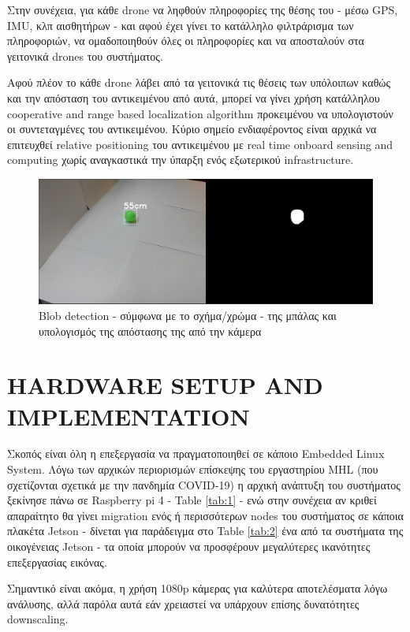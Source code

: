 Στην συνέχεια, για κάθε drone να ληφθούν πληροφορίες της θέσης του - μέσω GPS, IMU, κλπ αισθητήρων -
και αφού έχει γίνει το κατάλληλο φιλτράρισμα των πληροφοριών, να ομαδοποιηθούν όλες οι πληροφορίες και 
να αποσταλούν στα γειτονικά drones του συστήματος. 

Αφού πλέον το κάθε drone λάβει από τα γειτονικά τις 
θέσεις των υπόλοιπων καθώς και την απόσταση του αντικειμένου από αυτά, μπορεί να γίνει χρήση κατάλληλου
cooperative and range based localization algorithm προκειμένου να υπολογιστούν οι συντεταγμένες του αντικειμένου.
Κύριο σημείο ενδια\-φέ\-ρο\-ντος είναι αρχικά να επιτευχθεί relative positioning του α\-ντι\-κει\-μένου με real time 
onboard sensing and computing χωρίς αναγκαστικά την ύπαρξη ενός εξωτερικού infrastructure.

\begin{figure}[thpb]
  \centering
  \includegraphics[width=\linewidth]{Images/Thesis-Proposal-shape-color-detection.png}
  \caption{Blob detection - σύμφωνα με το σχήμα/χρώμα - της μπάλας και υπολογισμός της απόστασης της από την κάμερα}
  \label{fig:2}
\end{figure}

\section{HARDWARE SETUP AND IMPLEMENTATION}
Σκοπός είναι όλη η επεξεργασία να πραγματοποιηθεί σε κάποιο Embedded Linux System. 
Λόγω των αρχικών πε\-ριο\-ρι\-σμών επίσκεψης του εργαστηρίου MHL (που σχετίζονται σχετικά με την πανδημία COVID-19)
η αρχική ανάπτυξη του συστήματος ξεκίνησε πάνω σε Raspberry pi 4 - Table \ref{tab:1} - ενώ στην συνέχεια αν κριθεί απαραίτητο
θα γίνει migration ενός ή περι\-σσό\-τε\-ρων nodes του συστήματος σε κάποια πλακέτα Jetson - δίνεται για παράδειγμα 
στο Table \ref{tab:2} ένα από τα συστήματα της οικογένειας Jetson - τα οποία μπορούν να προσφέρουν μεγαλύτερες ικανότητες
επεξεργασίας εικόνας. 

Σημαντικό είναι ακόμα, η χρήση 1080p κάμερας για καλύτερα αποτελέσματα λόγω ανάλυσης, αλλά παρόλα αυτά εάν χρειαστεί να 
υπάρχουν επίσης δυνατότητες downscaling. 

